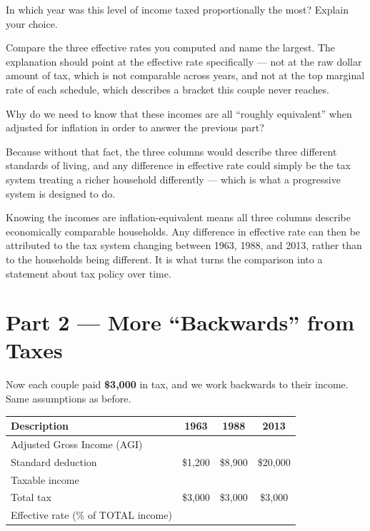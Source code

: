 \documentclass[12pt]{ximera}
\begin{document}
\begin{problem}
In which year was this level of income taxed proportionally the most? Explain your
choice.

\begin{freeResponse}
\end{freeResponse}

\begin{solution}
Compare the three effective rates you computed and name the largest. The explanation
should point at the effective rate specifically --- not at the raw dollar amount of tax,
which is not comparable across years, and not at the top marginal rate of each schedule,
which describes a bracket this couple never reaches.
\end{solution}
\end{problem}

\begin{problem}
Why do we need to know that these incomes are all ``roughly equivalent'' when adjusted
for inflation in order to answer the previous part?

\begin{freeResponse}
\end{freeResponse}

\begin{solution}
Because without that fact, the three columns would describe three different standards of
living, and any difference in effective rate could simply be the tax system treating a
richer household differently --- which is what a progressive system is designed to do.

Knowing the incomes are inflation-equivalent means all three columns describe
economically comparable households. Any difference in effective rate can then be
attributed to the tax system changing between 1963, 1988, and 2013, rather than to the
households being different. It is what turns the comparison into a statement about tax
policy over time.
\end{solution}
\end{problem}

\section*{Part 2 --- More ``Backwards'' from Taxes}

Now each couple paid \textbf{\$3,000} in tax, and we work backwards to their income.
Same assumptions as before.

\begin{center}
\begin{tabular}{|l|c|c|c|}
\hline
\textbf{Description} & \textbf{1963} & \textbf{1988} & \textbf{2013} \\
\hline
Adjusted Gross Income (AGI) & & & \\
\hline
Standard deduction & \$1,200 & \$8,900 & \$20,000 \\
\hline
Taxable income & & & \\
\hline
Total tax & \$3,000 & \$3,000 & \$3,000 \\
\hline
Effective rate (\% of TOTAL income) & & & \\
\hline
\end{tabular}
\end{center}
\end{document}
